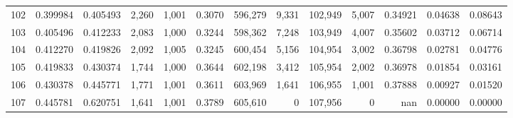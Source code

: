 \begin{tabular}{rrrrrrrrrrrrr}
102 &  0.399984 &  0.405493 &   2,260 &  1,001 &                                     0.3070 &  596,279 &    9,331 &  102,949 &    5,007 &  0.34921 &  0.04638 &  0.08643 \\
103 &  0.405496 &  0.412233 &   2,083 &  1,000 &                                     0.3244 &  598,362 &    7,248 &  103,949 &    4,007 &  0.35602 &  0.03712 &  0.06714 \\
104 &  0.412270 &  0.419826 &   2,092 &  1,005 &                                     0.3245 &  600,454 &    5,156 &  104,954 &    3,002 &  0.36798 &  0.02781 &  0.04776 \\
105 &  0.419833 &  0.430374 &   1,744 &  1,000 &                                     0.3644 &  602,198 &    3,412 &  105,954 &    2,002 &  0.36978 &  0.01854 &  0.03161 \\
106 &  0.430378 &  0.445771 &   1,771 &  1,001 &                                     0.3611 &  603,969 &    1,641 &  106,955 &    1,001 &  0.37888 &  0.00927 &  0.01520 \\
107 &  0.445781 &  0.620751 &   1,641 &  1,001 &                                     0.3789 &  605,610 &        0 &  107,956 &        0 &      nan &  0.00000 &  0.00000 \\
\bottomrule
\end{tabular}
